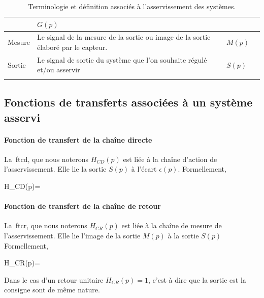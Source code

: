 \begin{table}[!h]
\begin{center}
\begin{tabular}{M{3cm}M{8cm}M{4cm}N}
                                      & $G(p)$                                   &\\[3em]
        \hline
        Mesure          & Le signal de la mesure de la sortie ou image de la sortie
                          élaboré par le capteur.
                                      & $M(p)$                                   &\\[3em]  
        \hline
        Sortie          & Le signal de sortie du système que l'on souhaite régulé et/ou asservir
                                      & $S(p)$                                   &\\[3em]
        \hhline{===}
    \end{tabular}
\end{center}
\caption{Terminologie et définition associés à l'asservissement des systèmes.\label{tab-asser}}
\end{table}

\clearpage

\subsection{Fonctions de transferts associées à un système asservi}


\paragraph{Fonction de transfert de la chaîne directe}

La~\gls{ftcd}, que nous noterons $H_{CD}(p)$ est liée à 
la chaîne d'action de l'asservissement. Elle lie la sortie $S(p)$ à l'écart $\epsilon(p)$.
Formellement,
\begin{bequation}
H_{CD}(p)=
\end{bequation}

\paragraph{Fonction de transfert de la chaîne de retour}

La~\gls{ftcr}, que nous noterons $H_{CR}(p)$ est 
liée à la chaîne de mesure de l'asservissement. Elle lie l'image de la sortie $M(p)$ à la sortie $S(p)$ 
Formellement,
\begin{bequation}
H_{CR}(p)=
\end{bequation}
Dans le cas d'un retour unitaire $H_{CR}(p)=1$, c'est à dire que la sortie est la consigne sont de même 
nature.

